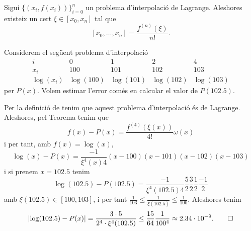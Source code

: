 \documentclass[../Apunts.tex]{subfiles}
\begin{document}
	\begin{corollary}
		Sigui \(\{(x_{i},f(x_{i}))\}_{i=0}^{n}\) un problema d'interpolació de Lagrange. Aleshores existeix un cert \(\xi\in[x_{0},x_{n}]\) tal que
		\[[x_{0},\dots,x_{n}]=\frac{f^{(n)}(\xi)}{n!}.\]
	\end{corollary}
	\begin{example}
		Considerem el següent problema d'interpolació
		\[\begin{array}{c|rrrr}
		i & 0 & 1 & 2 & 4\\\hline
		x_{i} & 100 & 101 & 102 & 103\\
		\log(x_{i}) & \log(100) & \log(101) & \log(102) & \log(103)
		\end{array}\]
		per \(P(x)\). Volem estimar l'error comés en calcular el valor de \(P(102.5)\).
	\end{example}
	\begin{solution}
		Per la definició de  tenim que aquest problema d'interpolació és de Lagrange. Aleshores, pel Teorema  tenim que
		\[f(x)-P(x)=\frac{f^{(4)}(\xi(x))}{4!}\omega(x)\]
		i per tant, amb \(f(x)=\log(x)\),
		\[\log(x)-P(x)=\frac{-1}{\xi^{4}(x)4}(x-100)(x-101)(x-102)(x-103)\]
		i si prenem \(x=102.5\) tenim
		\[\log(102.5)-P(102.5)=\frac{-1}{\xi^{4}(102.5)4}\frac{5}{2}\frac{3}{2}\frac{1}{2}\frac{-1}{2}\]
		amb \(\xi(102.5)\in[100,103]\), i per tant \(\frac{1}{103}\leq\frac{1}{\xi(102.5)}\leq\frac{1}{100}\). Aleshores tenim
		\[\abs{\log(102.5)-P(x)}=\frac{3\cdot5}{2^{4}\cdot\xi^{4}(102.5)}\leq\frac{15}{64}\frac{1}{100^{4}}\approx2.34\cdot10^{-9}.\qedhere\]
	\end{solution}
\end{document}
